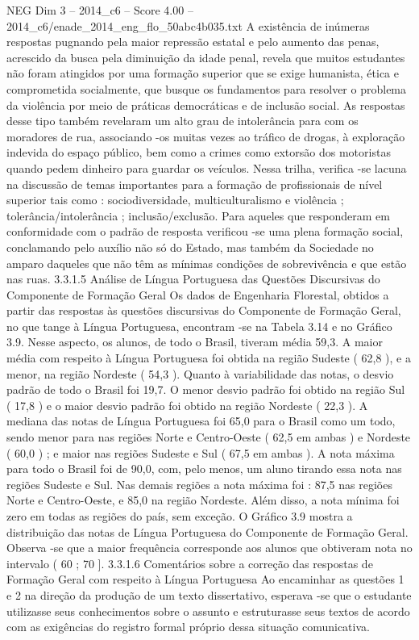 \begin{textsample}{NEG Dim 3 – 2014\_c6 – Score 4.00 – 2014\_c6/enade\_2014\_eng\_flo\_50abc4b035.txt}
A existência de inúmeras respostas pugnando pela maior repressão estatal e pelo aumento das penas, acrescido da busca pela diminuição da idade penal, revela que muitos estudantes não foram atingidos por uma formação superior que se exige humanista, ética e comprometida socialmente, que busque os fundamentos para resolver o problema da violência por meio de práticas democráticas e de inclusão social.
As respostas desse tipo também revelaram um alto grau de intolerância para com os moradores de rua, associando -os muitas vezes ao tráfico de drogas, à exploração indevida do espaço público, bem como a crimes como extorsão dos motoristas quando pedem dinheiro para guardar os veículos.
Nessa trilha, verifica -se lacuna na discussão de temas importantes para a formação de profissionais de nível superior tais como : sociodiversidade, multiculturalismo e violência ; tolerância/intolerância ; inclusão/exclusão.
Para aqueles que responderam em conformidade com o padrão de resposta verificou -se uma plena formação social, conclamando pelo auxílio não só do Estado, mas também da Sociedade no amparo daqueles que não têm as mínimas condições de sobrevivência e que estão nas ruas. 3.3.1.5 Análise de Língua Portuguesa das Questões Discursivas do Componente de Formação Geral Os dados de Engenharia Florestal, obtidos a partir das respostas às questões discursivas do Componente de Formação Geral, no que tange à Língua Portuguesa, encontram -se na Tabela 3.14 e no Gráfico 3.9.
Nesse aspecto, os alunos, de todo o Brasil, tiveram média 59,3.
A maior média com respeito à Língua Portuguesa foi obtida na região Sudeste ( 62,8 ), e a menor, na região Nordeste ( 54,3 ).
Quanto à variabilidade das notas, o desvio padrão de todo o Brasil foi 19,7.
O menor desvio padrão foi obtido na região Sul ( 17,8 ) e o maior desvio padrão foi obtido na região Nordeste ( 22,3 ).
A mediana das notas de Língua Portuguesa foi 65,0 para o Brasil como um todo, sendo menor para nas regiões Norte e Centro-Oeste ( 62,5 em ambas ) e Nordeste ( 60,0 ) ; e maior nas regiões Sudeste e Sul ( 67,5 em ambas ).
A nota máxima para todo o Brasil foi de 90,0, com, pelo menos, um aluno tirando essa nota nas regiões Sudeste e Sul.
Nas demais regiões a nota máxima foi : 87,5 nas regiões Norte e Centro-Oeste, e 85,0 na região Nordeste.
Além disso, a nota mínima foi zero em todas as regiões do país, sem exceção.
O Gráfico 3.9 mostra a distribuição das notas de Língua Portuguesa do Componente de Formação Geral.
Observa -se que a maior frequência corresponde aos alunos que obtiveram nota no intervalo ( 60 ; 70 ]. 3.3.1.6 Comentários sobre a correção das respostas de Formação Geral com respeito à Língua Portuguesa Ao encaminhar as questões 1 e 2 na direção da produção de um texto dissertativo, esperava -se que o estudante utilizasse seus conhecimentos sobre o assunto e estruturasse seus textos de acordo com as exigências do registro formal próprio dessa situação comunicativa.

\end{textsample}
